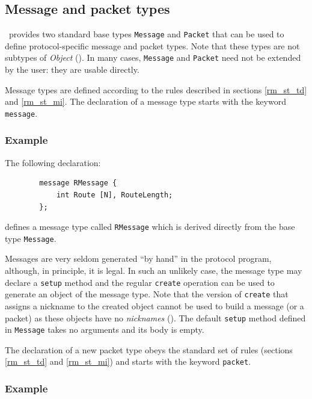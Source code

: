 \subsection{Message and packet types}
\label{rm_cl_mp}

\smurph\ provides two standard base types {\tt Message} and {\tt Packet}
that can be used to define protocol-specific message and packet types.
Note that these types are not subtypes of {\em Object\/} ().
In many cases, {\tt Message} and {\tt Packet} need not be extended by
the user: they are usable directly.

Message types are defined according to the rules described in sections
\ref{rm_st_td} and \ref{rm_st_mi}.
The declaration of a message type starts with the keyword {\tt message}.

\subsubsection*{Example}

\noindent
The following declaration:
\begin{verbatim}
        message RMessage {
            int Route [N], RouteLength;
        };
\end{verbatim}
defines a message type called {\tt RMessage} which is derived directly from
the base type {\tt Message}.

\medskip

\noindent
Messages are very seldom generated ``by hand'' in the protocol program,
although, in principle, it is legal.
In such an unlikely case, the message type may declare a {\tt setup} method
and the regular {\tt create} operation can be used to generate an object
of the message type.
Note that the version of {\tt create} that assigns a nickname to the created
object cannot be used to build a message (or a packet) as
these objects have no {\em nicknames} ().
The default {\tt setup} method defined in {\tt Message} takes no arguments
and its body is empty.

The declaration of a new packet type obeys the standard set of rules
(sections \ref{rm_st_td} and \ref{rm_st_mi}) and
starts with the keyword {\tt packet}.

\subsubsection*{Example}

